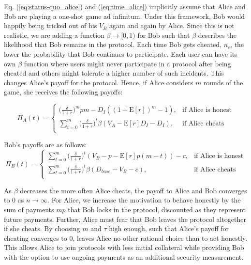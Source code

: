 \documentclass[runningheads]{llncs}
\begin{document}
Eq. (\ref{eq:status-quo_alice}) and (\ref{eq:time_alice}) implicitly assume that Alice and Bob are playing a one-shot game ad infinitum.
Under this framework, Bob would happily being tricked out of his $V_B$ again and again by Alice.
Since this is not realistic, we are adding a function $\beta \to [0,1)$ for Bob such that $\beta$ describes the likelihood that Bob remains in the protocol.
Each time Bob gets cheated, $n_c$, the lower the probability that Bob continues to participate.
Each user can have its own $\beta$ function where users might never participate in a protocol after being cheated and others might tolerate a higher number of such incidents.
This changes Alice's payoff for the protocol.
Hence, if Alice considers $m$ rounds of the game, she receives the following payoffs:

\begin{equation}
\label{eq:promise_alice}
\Pi_A(t) = 
\begin{cases}
    \big( \frac{\delta}{1+r} \big)^{m} pm - D_{I}((1+\mathrm{E}[r])^{m}-1), & \text{if Alice is honest} \\
    \sum_{t=0}^{m} \big( \frac{\delta}{1+r} \big)^{t} \beta (V_A - \mathrm{E}[r]D_{I}-D_{I}), & \text{if Alice cheats} \\
\end{cases}
\end{equation}

Bob's payoffs are as follows:
\begin{equation}
\label{eq:promise_bob}
\Pi_B (t) = 
\begin{cases}
\sum_{t=0}^{m} \big( \frac{\delta}{1+r} \big)^t (V_B - p - \mathrm{E}[r]p(m-t)) - c, & \text{if Alice is honest} \\
\sum_{t=0}^{m} \big( \frac{\delta}{1+r} \big)^t \beta (D_{base} -V_B -c) , & \text{if Alice cheats} \\
\end{cases}
\end{equation}


As $\beta$ decreases the more often Alice cheats, the payoff to Alice and Bob converges to $0$ as $n \rightarrow \infty$.
For Alice, we increase the motivation to behave honestly by the sum of payments $mp$ that Bob locks in the protocol, discounted as they represent future payments.
Further, Alice must fear that Bob leaves the protocol altogether if she cheats. %
By choosing $m$ and $\tau$ high enough, such that Alice's payoff for cheating converges to $0$, leaves Alice no other rational choice than to act honestly.
This allows Alice to join protocols with less initial collateral while providing Bob with the option to use ongoing payments as an additional security measurement.
\end{document}
